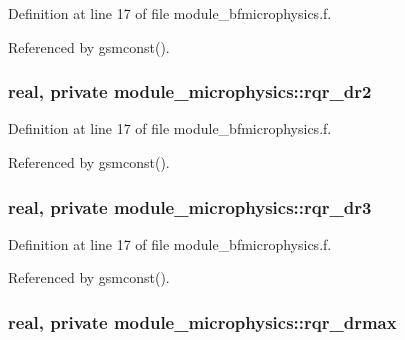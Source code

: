 Definition at line 17 of file module\+\_\+bfmicrophysics.\+f.



Referenced by gsmconst().

\subsubsection[{\texorpdfstring{rqr\+\_\+dr2}{rqr_dr2}}]{\setlength{\rightskip}{0pt plus 5cm}real, private module\+\_\+microphysics\+::rqr\+\_\+dr2\hspace{0.3cm}{\ttfamily [private]}}\hypertarget{namespacemodule__microphysics_ab0d5f615986c3482d2fad8542c4f52b8}{}\label{namespacemodule__microphysics_ab0d5f615986c3482d2fad8542c4f52b8}


Definition at line 17 of file module\+\_\+bfmicrophysics.\+f.



Referenced by gsmconst().

\subsubsection[{\texorpdfstring{rqr\+\_\+dr3}{rqr_dr3}}]{\setlength{\rightskip}{0pt plus 5cm}real, private module\+\_\+microphysics\+::rqr\+\_\+dr3\hspace{0.3cm}{\ttfamily [private]}}\hypertarget{namespacemodule__microphysics_a1408a4c383136f8beb5d92049a5461a1}{}\label{namespacemodule__microphysics_a1408a4c383136f8beb5d92049a5461a1}


Definition at line 17 of file module\+\_\+bfmicrophysics.\+f.



Referenced by gsmconst().

\subsubsection[{\texorpdfstring{rqr\+\_\+drmax}{rqr_drmax}}]{\setlength{\rightskip}{0pt plus 5cm}real, private module\+\_\+microphysics\+::rqr\+\_\+drmax\hspace{0.3cm}{\ttfamily [private]}}\hypertarget{namespacemodule__microphysics_ae58b71fa9e96b0836c12a143455ca83b}{}\label{namespacemodule__microphysics_ae58b71fa9e96b0836c12a143455ca83b}


